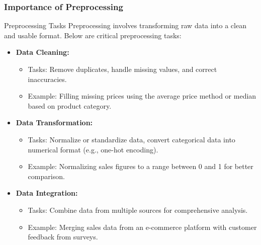 \documentclass[aspectratio=169]{beamer}
\begin{document}
\begin{frame}[fragile]
    \frametitle{Importance of Preprocessing}
    \begin{block}{Preprocessing Tasks}
        Preprocessing involves transforming raw data into a clean and usable format. Below are critical preprocessing tasks:
    \end{block}
    \begin{itemize}
        \item \textbf{Data Cleaning:}
        \begin{itemize}
            \item Tasks: Remove duplicates, handle missing values, and correct inaccuracies.
            \item Example: Filling missing prices using the average price method or median based on product category.
        \end{itemize}
        
        \item \textbf{Data Transformation:}
        \begin{itemize}
            \item Tasks: Normalize or standardize data, convert categorical data into numerical format (e.g., one-hot encoding).
            \item Example: Normalizing sales figures to a range between 0 and 1 for better comparison.
        \end{itemize}
        
        \item \textbf{Data Integration:}
        \begin{itemize}
            \item Tasks: Combine data from multiple sources for comprehensive analysis.
            \item Example: Merging sales data from an e-commerce platform with customer feedback from surveys.
        \end{itemize}
    \end{itemize}
\end{frame}
\end{document}
